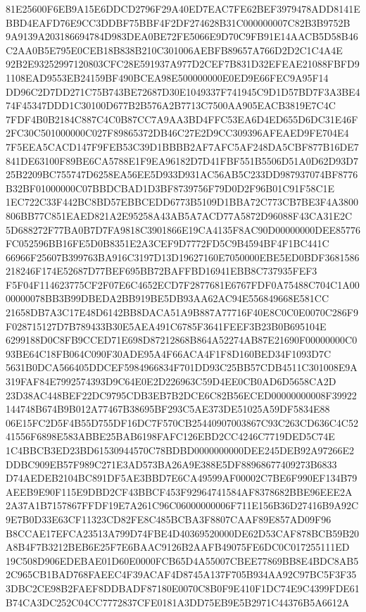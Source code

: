 \documentclass[UTF8,fontset=fandol,zihao=-4,a4paper]{ctexart}
\begin{document}
{{81E25600F6EB9A15E6DDCD2796F29A40ED7EAC7FE62BEF3979478ADD8141EBBD4EAFD76E9CC3DDBF75BBF4F2DF274628B31C000000007C82B3B9752B
9A9139A203186694784D983DEA0BE72FE5066E9D70C9FB91E14AACB5D58B46C2AA0B5E795E0CEB18B838B210C301006AEBFB89657A766D2D2C1C4A4E
92B2E93252997120803CFC28E591937A977D2CEF7B831D32EFEAE21088FBFD91108EAD9553EB24159BF490BCEA98E500000000E0ED9E66FEC9A95F14
DD96C2D7DD271C75B743BE72687D30E1049337F741945C9D1D57BD7F3A3BE474F45347DDD1C30100D677B2B576A2B7713C7500AA905EACB3819E7C4C
7FDF4B0B2184C887C4C0B87CC7A9AA3BD4FFC53EA6D4ED655D6DC31E46F2FC30C501000000C027F89865372DB46C27E2D9CC309396AFEAED9FE704E4
7F5EEA5CACD147F9FEB53C39D1BBBB2AF7AFC5AF248DA5CBF877B16DE7841DE63100F89BE6CA5788E1F9EA96182D7D41FBF551B5506D51A0D62D93D7
25B2209BC755747D6258EA56EE5D933D931AC56AB5C233DD987937074BF8776B32BF01000000C07BBDCBAD1D3BF8739756F79D0D2F96B01C91F58C1E
1EC722C33F442BC8BD57EBBCEDD6773B5109D1BBA72C773CB7BE3F4A3800806BB77C851EAED821A2E95258A43AB5A7ACD77A5872D96088F43CA31E2C
5D688272F77BA0B7D7FA9818C3901866E19CA4135F8AC90D00000000DEE85776FC052596BB16FE5D0B8351E2A3CEF9D7772FD5C9B4594BF4F1BC441C
66966F25607B399763BA916C3197D13D19627160E7050000EBE5ED0BDF3681586218246F174E52687D77BEF695BB72BAFFBD16941EBB8C737935FEF3
F5F04F114623775CF2F07E6C4652ECD7F2877681E6767FDF0A75488C704C1A0000000078BB3B99DBEDA2BB919BE5DB93AA62AC94E556849668E581CC
21658DB7A3C17E48D6142BB8DACA51A9B887A77716F40E8C0C0E0070C286F9F028715127D7B789433B30E5AEA491C6785F3641FEEF3B23B0B695104E
6299188D0C8FB9CCED71E698D87212868B864A52274AB87E21690F00000000C093BE64C18FB064C090F30ADE95A4F66ACA4F1F8D160BED34F1093D7C
5631B0DCA566405DDCEF5984966834F701DD93C25BB57CDB4511C301008E9A319FAF84E7992574393D9C64E0E2D226963C59D4EE0CB0AD6D5658CA2D
23D38AC448BEF22DC9795CDB3EB7B2DCE6C82B56ECED00000000008F39922144748B674B9B012A77467B38695BF293C5AE373DE51025A59DF5834E88
06E15FC2D5F4B55D755DF16DC7F570CB25440907003867C93C263CD636C4C5241556F6898E583ABBE25BAB6198FAFC126EBD2CC4246C7719DED5C74E
1C4BBCB3ED23BD61530944570C78BDBD0000000000DEE245DEB92A97266E2DDBC909EB57F989C271E3AD573BA26A9E388E5DF88968677409273B6833
D74AEDEB2104BC891DF5AE3BBD7E6CA49599AF00002C7BE6F990EF134B79AEEB9E90F115E9DBD2CF43BBCF453F92964741584AF8378682BBE96EEE2A
2A37A1B7157867FFDF19E7A261C96C06000000006F711E156B36D27416B9A92C9E7B0D33E63CF11323CD82FE8C485BCBA3F8807CAAF89E857AD09F96
B8CCAE17EFCA23513A799D74FBE4D40369520000DE62D53CAF878BCB59B20A8B4F7B3212BEB6E25F7E6BAAC9126B2AAFB49075FE6DC0C017255111ED
19C508D906EDEBAE01D60E0000FCB65D4A55007CBEE77869BB8E4BDC8AB52C965CB1BAD768FAEEC4F39ACAF4D8745A137F705B934AA92C97BC5F3F35
3DBC2CE98B2FAEF8DDBADF87180E0070C8B0F9E410F1DC74E9C4399FDE61B74CA3DC252C04CC7772837CFE0181A3DD75EB9E5B2971C44376B5A6612A
}}
\end{document}
